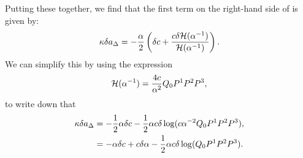 Putting these together, we find that the first term on the right-hand side of  is given by:
\begin{equation*}
    \kappa \delta a_\Delta = -\frac{\alpha}{2} \left( \delta c + \frac{c \delta {\cal H}(\alpha^{-1})}{{\cal H}(\alpha^{-1})} \right).
\end{equation*}
We can simplify this by using the expression
\begin{equation*}
    {\cal H}(\alpha^{-1}) = \frac{4 c}{\alpha^2} Q_0 P^1 P^2 P^3,
\end{equation*}
to write down that
\begin{equation*}
\begin{aligned}
        \kappa \delta a_\Delta &= -\frac{1}{2} \alpha  \delta c - \frac{1}{2} \alpha  c \delta \log(c\alpha^{-2} Q_0 P^1 P^2 P^3), \\
        &= -\alpha  \delta c +  c \delta \alpha - \frac{1}{2} \alpha  c \delta \log(Q_0 P^1 P^2 P^3).
\end{aligned}
\end{equation*}
